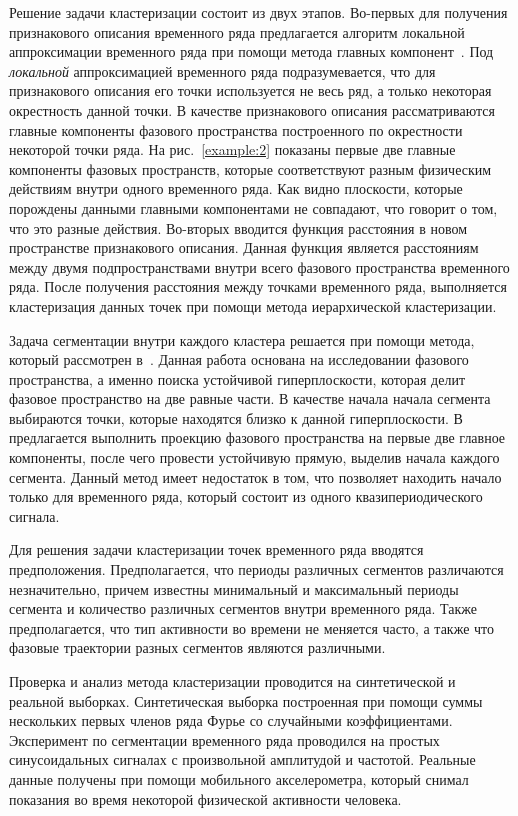 \documentclass[12pt, twoside]{article}
\numberwithin{equation}{section}
\begin{document}
Решение задачи кластеризации состоит из двух этапов. Во-первых для получения признакового описания временного ряда предлагается алгоритм локальной аппроксимации временного ряда при помощи метода главных компонент~\cite{Shiglavsi1997}. Под \textit{локальной} аппроксимацией временного ряда подразумевается, что для признакового описания его точки используется не весь ряд, а только некоторая окрестность данной точки. В качестве признакового описания рассматриваются главные компоненты фазового пространства построенного по окрестности некоторой точки ряда. На рис.~\ref{example:2} показаны первые две главные компоненты фазовых пространств, которые соответствуют разным физическим действиям внутри одного временного ряда. Как видно плоскости, которые порождены данными главными компонентами не совпадают, что говорит о том, что это разные действия.  Во-вторых вводится функция расстояния в новом пространстве признакового описания. Данная функция является расстояниям между двумя подпространствами внутри всего фазового пространства временного ряда. После получения расстояния между точками временного ряда, выполняется кластеризация данных точек при помощи метода иерархической кластеризации.

Задача сегментации внутри каждого кластера решается при помощи метода, который рассмотрен в~\cite{motrenko2015}. Данная работа основана на исследовании фазового пространства, а именно поиска устойчивой гиперплоскости, которая делит фазовое пространство на две равные части. В качестве начала начала сегмента выбираются точки, которые находятся близко к данной гиперплоскости. В~\cite{motrenko2015} предлагается выполнить проекцию фазового пространства на первые две главное компоненты, после чего провести устойчивую прямую, выделив начала каждого сегмента. Данный метод имеет недостаток в том, что позволяет находить начало только для временного ряда, который состоит из одного квазипериодического сигнала.

Для решения задачи кластеризации точек временного ряда вводятся предположения. Предполагается, что периоды различных сегментов различаются незначительно, причем известны минимальный и максимальный периоды сегмента и количество различных сегментов внутри временного ряда. Также предполагается, что тип активности во времени не меняется часто, а также что фазовые траектории разных сегментов являются различными. 

Проверка и анализ метода кластеризации проводится на синтетической и реальной выборках. Синтетическая выборка построенная при помощи суммы нескольких первых членов ряда Фурье со случайными коэффициентами. Эксперимент по сегментации временного ряда проводился на простых синусоидальных сигналах с произвольной амплитудой и частотой. Реальные данные получены при помощи мобильного акселерометра, который снимал показания во время некоторой физической активности человека. 
\end{document}
